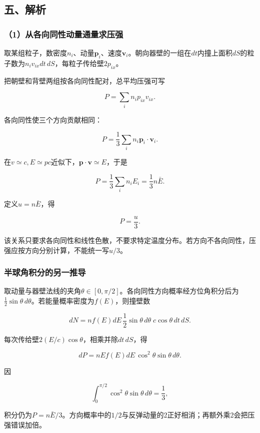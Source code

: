 \documentclass[12pt,a4paper,fontset=fandol]{ctexart}
\begin{document}
\subsection{五、解析}\label{ux4e94ux89e3ux6790-6}

\subsubsection{（1）从各向同性动量通量求压强}\label{ux4eceux5404ux5411ux540cux6027ux52a8ux91cfux901aux91cfux6c42ux538bux5f3a}

取某组粒子，数密度\(n_i\)、动量\(\boldsymbol p_i\)、速度\(\boldsymbol v_i\)。朝向器壁的一组在\(dt\)内撞上面积\(dS\)的粒子数为\(n_iv_{ix}dt\,dS\)，每粒子传给壁\(2p_{ix}\)。

把朝壁和背壁两组按各向同性配对，总平均压强可写

\[
P=\sum_i n_i p_{ix}v_{ix}.
\]

各向同性使三个方向贡献相同：

\[
P=\frac13\sum_i n_i\boldsymbol p_i\cdot\boldsymbol v_i.
\]

在\(v\simeq c,E\simeq pc\)近似下，\(\boldsymbol p\cdot\boldsymbol v\simeq E\)，于是

\[
P=\frac13\sum_i n_iE_i
=\frac13n\bar E.
\]

定义\(u=n\bar E\)，得

\[
\boxed{P=\frac u3}.
\]

该关系只要求各向同性和线性色散，不要求特定温度分布。若方向不各向同性，压强应按方向分别计算，不能统一写\(u/3\)。

\subsubsection{半球角积分的另一推导}\label{ux534aux7403ux89d2ux79efux5206ux7684ux53e6ux4e00ux63a8ux5bfc}

取动量与器壁法线的夹角\(\theta\in[0,\pi/2]\)。各向同性方向概率经方位角积分后为\(\frac12\sin\theta\,d\theta\)。若能量概率密度为\(f(E)\)，则撞壁数

\[
dN=n f(E)dE\,\frac12\sin\theta\,d\theta
\;c\cos\theta\,dt\,dS.
\]

每次传给壁\(2(E/c)\cos\theta\)，相乘并除\(dt\,dS\)，得

\[
dP=nE f(E)dE\,\cos^2\theta\sin\theta\,d\theta.
\]

因

\[
\int_0^{\pi/2}\cos^2\theta\sin\theta\,d\theta=\frac13,
\]

积分仍为\(P=n\bar E/3\)。方向概率中的\(1/2\)与反弹动量的2正好相消；再额外乘2会把压强错误加倍。
\end{document}
